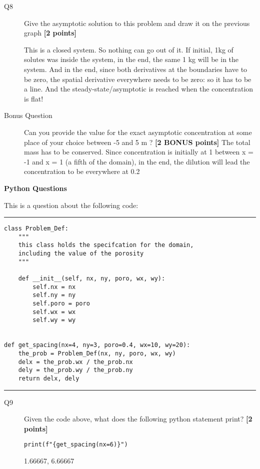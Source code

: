 \documentclass{article}
\newcommand{\ans}[1]{\textcolor{dark-green}{#1}}
\begin{document}
\begin{description}
\item [Q8] Give the asymptotic solution to this problem and draw it on the previous graph  \textbf{[2 points]}

\ans{This is a closed system. So nothing can go out of it. If initial, 1kg of solutes was inside the system, in the end, the same 1 kg will be in the system. And in the end, since both derivatives at the boundaries have to be zero, the spatial derivative everywhere needs to be zero: so it has to be a line. And the steady-state/asymptotic is reached when the concentration is flat! }

\item[Bonus Question] Can you provide the value for the exact asymptotic concentration at some place of your choice between -5 and 5 m ? \textbf{[2 BONUS points]}
\ans{The total mass has to be conserved. Since concentration is initially at 1 between x = -1 and x = 1 (a fifth of the domain), in the end, the dilution will lead the concentration to be everywhere at 0.2 }

\end{description}


\newpage
\textbf{Python Questions}


This is a question about the following code:

\rule{15cm}{0.75pt}


\begin{verbatim}
class Problem_Def:
    """
    this class holds the specifcation for the domain,
    including the value of the porosity
    """

    def __init__(self, nx, ny, poro, wx, wy):
        self.nx = nx
        self.ny = ny
        self.poro = poro
        self.wx = wx
        self.wy = wy


def get_spacing(nx=4, ny=3, poro=0.4, wx=10, wy=20):
    the_prob = Problem_Def(nx, ny, poro, wx, wy)
    delx = the_prob.wx / the_prob.nx
    dely = the_prob.wy / the_prob.ny
    return delx, dely
\end{verbatim}

\rule{15cm}{0.75pt}

\begin{description}

\item[Q9] Given the code above, what does the following python statement print?
  \textbf{[2 points]}
  
\verb+print(f"{get_spacing(nx=6)}")+

\ans{1.66667, 6.66667}
  
\end{description}
\end{document}
